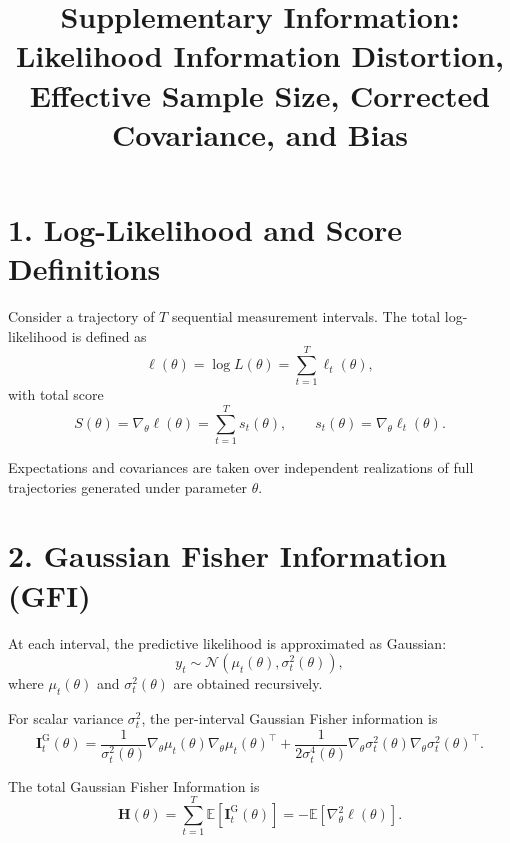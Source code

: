 \documentclass[11pt]{article}
\title{Supplementary Information: Likelihood Information Distortion, Effective Sample Size, Corrected Covariance, and Bias}
\author{}
\date{}
\begin{document}
\maketitle

\section*{1. Log-Likelihood and Score Definitions}

Consider a trajectory of $T$ sequential measurement intervals.
The total log-likelihood is defined as
\begin{equation}
\ell(\theta) = \log L(\theta) = \sum_{t=1}^T \ell_t(\theta),
\end{equation}
with total score
\begin{equation}
S(\theta) = \nabla_\theta \ell(\theta)
= \sum_{t=1}^T s_t(\theta),
\qquad
s_t(\theta) = \nabla_\theta \ell_t(\theta).
\end{equation}

Expectations and covariances are taken over independent realizations of full trajectories generated under parameter $\theta$.

\section*{2. Gaussian Fisher Information (GFI)}

At each interval, the predictive likelihood is approximated as Gaussian:
\begin{equation}
y_t \sim \mathcal{N}\!\left(\mu_t(\theta), \sigma_t^2(\theta)\right),
\end{equation}
where $\mu_t(\theta)$ and $\sigma_t^2(\theta)$ are obtained recursively.

For scalar variance $\sigma_t^2$, the per-interval Gaussian Fisher information is
\begin{equation}
\mathbf I_t^{\mathrm{G}}(\theta)
=
\frac{1}{\sigma_t^2(\theta)}
\nabla_\theta \mu_t(\theta)
\nabla_\theta \mu_t(\theta)^\top
+
\frac{1}{2\sigma_t^4(\theta)}
\nabla_\theta \sigma_t^2(\theta)
\nabla_\theta \sigma_t^2(\theta)^\top.
\end{equation}

The total Gaussian Fisher Information is
\begin{equation}
\mathbf H(\theta)
=
\sum_{t=1}^T \mathbb{E}\!\left[\mathbf I_t^{\mathrm{G}}(\theta)\right]
=
- \mathbb{E}\!\left[\nabla_\theta^2 \ell(\theta)\right].
\end{equation}
\end{document}
